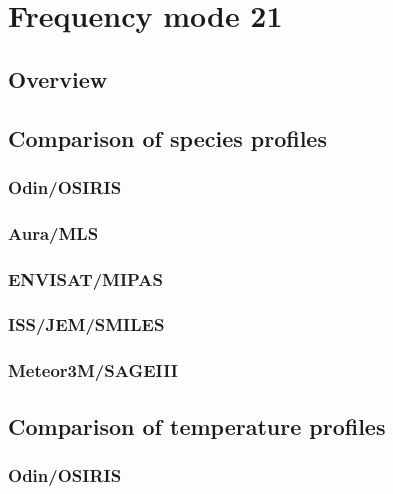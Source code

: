 \section{Frequency mode 21}
\label{sec:fm21}

\subsection{Overview}
\label{sec:fm21:overview}

\subsection{Comparison of species profiles}
\label{sec:fm21:comparison:species}

\subsubsection{Odin/OSIRIS}
\label{sec:fm21:comparison:species:osiris}

\subsubsection{Aura/MLS}
\label{sec:fm21:comparison:species:mls}

\subsubsection{ENVISAT/MIPAS}
\label{sec:fm21:comparison:species:mipas}

\subsubsection{ISS/JEM/SMILES}
\label{sec:fm21:comparison:species:smiles}

\subsubsection{Meteor3M/SAGEIII}
\label{sec:fm21:comparison:species:sage3}


\subsection{Comparison of temperature profiles}
\label{sec:fm21:comparison:temperature}

\subsubsection{Odin/OSIRIS}
\label{sec:fm21:comparison:temperature:osiris}

